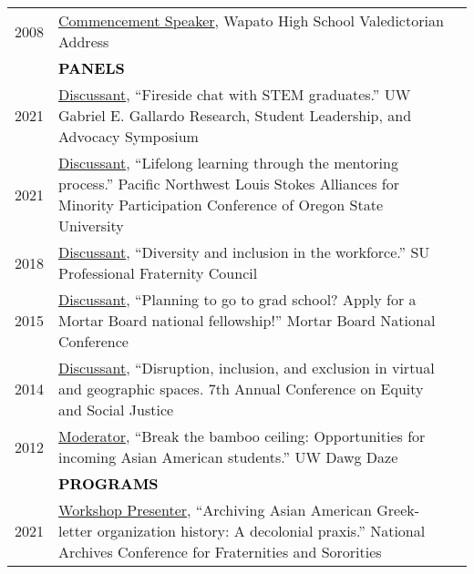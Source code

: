 \documentclass[11pt]{article}
\begin{document}
{{\begin{longtable}{Rp{0.75in}p{5.0in}}
\footnotesize{2008} & \href{https://youtu.be/5gt7nFRgkac}{{Commencement Speaker}}, Wapato High School Valedictorian Address\\

\pagebreak

& \textcolor{black}{\uppercase{\textbf{Panels}}}\\

\footnotesize{2021} & 
\href{https://www.washington.edu/uwmcnair/annual-mcnair-conference-2/2021-conference-program/}{{Discussant}}, ``Fireside chat with STEM graduates.'' UW Gabriel E. Gallardo Research, Student Leadership, and Advocacy Symposium\\

\footnotesize{2021} & \href{https://studentaffairs.oregonstate.edu/LSAMP}{{Discussant}}, ``Lifelong learning through the mentoring process.'' Pacific Northwest Louis Stokes Alliances for Minority Participation Conference of Oregon State University\\

\footnotesize{2018} & \href{https://www.facebook.com/events/170505843576915/}{{Discussant}}, ``Diversity and inclusion in the workforce.'' SU Professional Fraternity Council\\

\footnotesize{2015} & \href{https://web.archive.org/web/20210326175437/https://www.mortarboard.org/Docs/2015\%20CONFERENCE\%20PROGRAM.pdf}{{Discussant}}, ``Planning to go to grad school? Apply for a Mortar Board national fellowship!'' Mortar Board National Conference\\

\footnotesize{2014} & \href{https://web.archive.org/web/20150129171123/http://7thannualconferenceonequity2014.sched.org/list/descriptions/}{{Discussant}}, ``Disruption, inclusion, and exclusion in virtual and geographic spaces. 7th Annual Conference on Equity and Social Justice\\

\footnotesize{2012} & \href{https://www.facebook.com/events/410710345657255/}{{Moderator}}, ``Break the bamboo ceiling: Opportunities for incoming Asian American students.'' UW Dawg Daze\\

& \textcolor{black}{\uppercase{\textbf{Programs}}}\\

\footnotesize{2021} &
\href{https://www.library.illinois.edu/slc/news-events/national-archives-conference/2021-schedule-of-events/}{{Workshop Presenter}}, ``Archiving Asian American Greek-letter organization history: A decolonial praxis.'' National Archives Conference for Fraternities and Sororities\\


\end{longtable}}}
\end{document}
